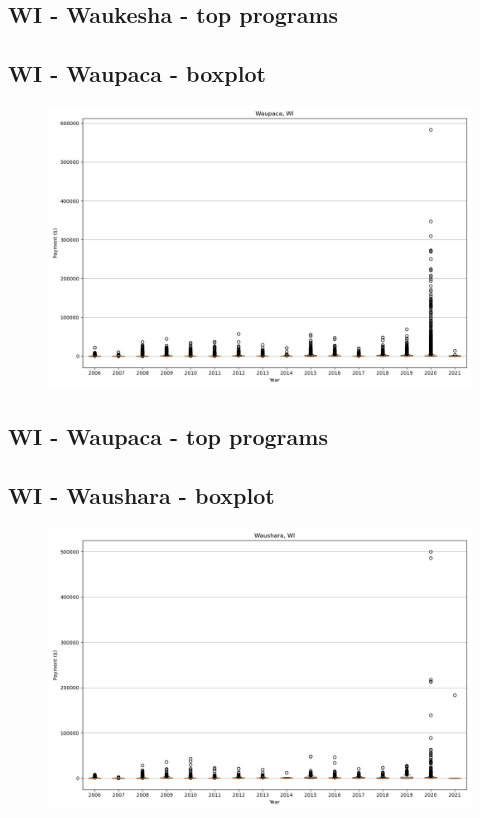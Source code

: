 \subsection*{WI - Waukesha - top programs}

\newpage
\subsection*{WI - Waupaca - boxplot}
\begin{figure}[h]
\centering
\includegraphics[width=7in]{../output/boxplots/counties/Waupaca-WI_boxplot.png}
\end{figure}


\subsection*{WI - Waupaca - top programs}

\newpage
\subsection*{WI - Waushara - boxplot}
\begin{figure}[h]
\centering
\includegraphics[width=7in]{../output/boxplots/counties/Waushara-WI_boxplot.png}
\end{figure}


